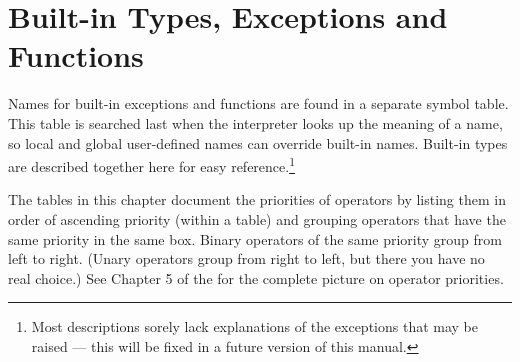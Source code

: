 \chapter{Built-in Types, Exceptions and Functions}
\label{builtin}

Names for built-in exceptions and functions are found in a separate
symbol table.  This table is searched last when the interpreter looks
up the meaning of a name, so local and global
user-defined names can override built-in names.  Built-in types are
described together here for easy reference.\footnote{
	Most descriptions sorely lack explanations of the exceptions
	that may be raised --- this will be fixed in a future version of
	this manual.}

The tables in this chapter document the priorities of operators by
listing them in order of ascending priority (within a table) and
grouping operators that have the same priority in the same box.
Binary operators of the same priority group from left to right.
(Unary operators group from right to left, but there you have no real
choice.)  See Chapter 5 of the  for the complete picture on operator priorities.
